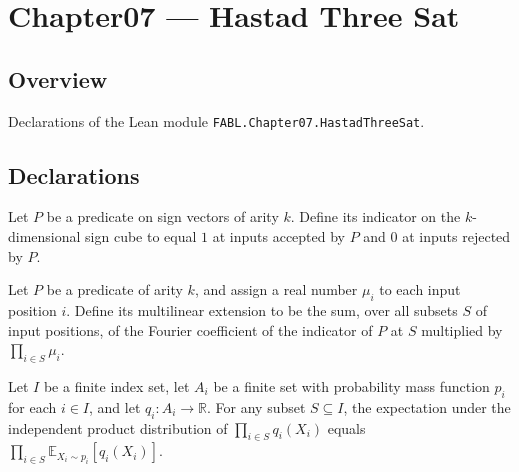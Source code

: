 \chapter{Chapter07 — Hastad Three Sat}
\section{Overview}

Declarations of the Lean module \texttt{FABL.Chapter07.HastadThreeSat}.

\section{Declarations}

\begin{definition}
\label{FABL.SignPredicate.indicator}
\leanok
{}
Let $P$ be a predicate on sign vectors of arity $k$. Define its indicator on the
$k$-dimensional sign cube to equal $1$ at inputs accepted by $P$ and $0$ at inputs
rejected by $P$.
\end{definition}

\begin{definition}
\label{FABL.SignPredicate.multilinearExtension}
\leanok
{}
Let $P$ be a predicate of arity $k$, and assign a real number $\mu_i$ to each input
position $i$. Define its multilinear extension to be the sum, over all subsets $S$ of
input positions, of the Fourier coefficient of the indicator of $P$ at $S$ multiplied by
$\prod_{i\in S}\mu_i$.
\end{definition}

\begin{theorem}
\label{FABL.pmfExpectation_independentProduct_subsetProd}
\leanok
{}
Let $I$ be a finite index set, let $A_i$ be a finite set with probability mass function
$p_i$ for each $i\in I$, and let $q_i:A_i\to\mathbb{R}$. For any subset $S\subseteq I$,
the expectation under the independent product distribution of $\prod_{i\in S}q_i(X_i)$
equals $\prod_{i\in S}\mathbb{E}_{X_i\sim p_i}[q_i(X_i)]$.
\end{theorem}

